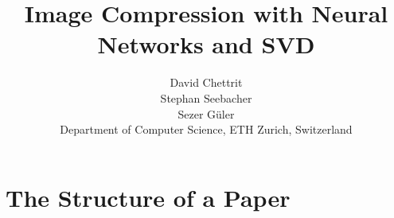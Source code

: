 \documentclass[10pt,conference,compsocconf]{IEEEtran}
\begin{document}
\title{Image Compression with Neural Networks and SVD}

\author{
  David Chettrit\\
  Stephan Seebacher\\
  Sezer G\"uler\\
  Department of Computer Science, ETH Zurich, Switzerland
}

\maketitle

\begin{abstract}

\end{abstract}




%

\section{The Structure of a Paper}
\label{sec:structure-paper}















\end{document}
